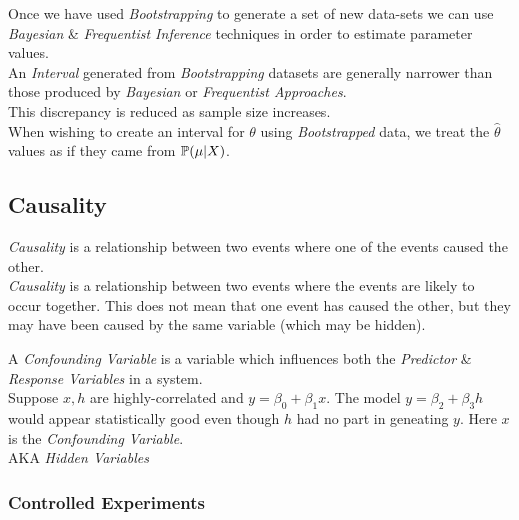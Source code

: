 \documentclass[11pt,a4paper]{article}
\begin{document}
Once we have used \textit{Bootstrapping} to generate a set of new data-sets we can use \textit{Bayesian} \& \textit{Frequentist Inference} techniques in order to estimate parameter values.\\

An \textit{Interval} generated from \textit{Bootstrapping} datasets are generally narrower than those produced by \textit{Bayesian} or \textit{Frequentist Approaches}.\\
\nb This discrepancy is reduced as sample size increases.\\

When wishing to create an interval for $\theta$ using \textit{Bootstrapped} data, we treat the $\hat\theta$ values as if they came from $\mathbb{P}(\mu|X)$.

\subsection{Causality}

\textit{Causality} is a relationship between two events where one of the events caused the other.\\

\textit{Causality} is a relationship between two events where the events are likely to occur together. This does not mean that one event has caused the other, but they may have been caused by the same variable (which may be hidden).\\

 
A \textit{Confounding Variable} is a variable which influences both the \textit{Predictor} \& \textit{Response Variables} in a system.\\
Suppose $x,h$ are highly-correlated and $y=\beta_0+\beta_1x$. The model $y=\beta_2+\beta_3h$ would appear statistically good even though $h$ had no part in geneating $y$. Here $x$ is the \textit{Confounding Variable}.\\
\nb AKA \textit{Hidden Variables}

\subsubsection{Controlled Experiments}
\end{document}
